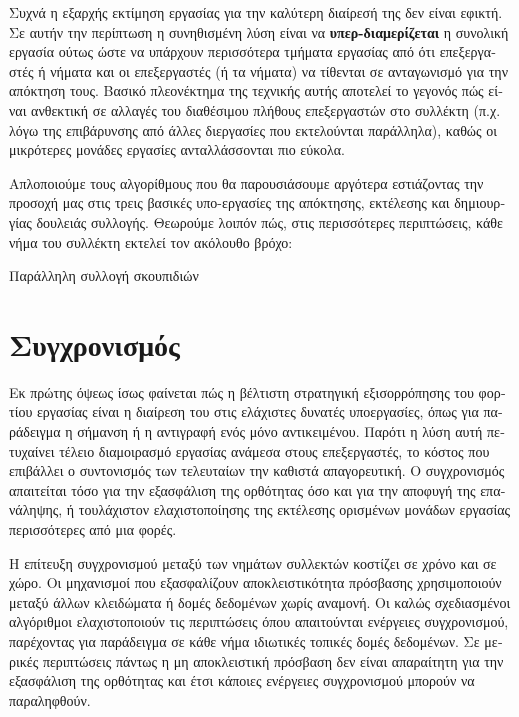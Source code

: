 \begin{greek}
Συχνά η εξαρχής εκτίμηση εργασίας για την καλύτερη διαίρεσή της
δεν είναι εφικτή. Σε αυτήν την περίπτωση η συνηθισμένη λύση
είναι να \textbf{υπερ-διαμερίζεται} η συνολική εργασία ούτως
ώστε να υπάρχουν περισσότερα τμήματα εργασίας από ότι επεξεργαστές
ή νήματα και οι επεξεργαστές (ή τα νήματα) να τίθενται σε
ανταγωνισμό για την απόκτηση τους. Βασικό πλεονέκτημα της τεχνικής
αυτής αποτελεί το γεγονός πώς είναι ανθεκτική σε αλλαγές του
διαθέσιμου πλήθους επεξεργαστών στο συλλέκτη (π.χ. λόγω της
επιβάρυνσης από άλλες διεργασίες που εκτελούνται παράλληλα), καθώς
οι μικρότερες μονάδες εργασίες ανταλλάσσονται πιο εύκολα.

Απλοποιούμε τους αλγορίθμους που θα παρουσιάσουμε αργότερα εστιάζοντας
την προσοχή μας στις τρεις βασικές υπο-εργασίες της απόκτησης,
εκτέλεσης και δημιουργίας δουλειάς συλλογής. Θεωρούμε λοιπόν πώς,
στις περισσότερες περιπτώσεις, κάθε νήμα του συλλέκτη εκτελεί
τον ακόλουθο βρόχο:

\begin{algorithm}
  \caption{Παράλληλη συλλογή σκουπιδιών}
  \label{alg:par_1}
  \begin{algorithmic}[1]
        \State {}
        \State {}
        \State {}
      \EndWhile
    \EndProcedure
  \end{algorithmic}
\end{algorithm}

\section{Συγχρονισμός}
Εκ πρώτης όψεως ίσως φαίνεται πώς η βέλτιστη στρατηγική
εξισορρόπησης του φορτίου εργασίας είναι η διαίρεση του στις
ελάχιστες δυνατές υποεργασίες, όπως για παράδειγμα η σήμανση
ή η αντιγραφή ενός μόνο αντικειμένου. Παρότι η λύση αυτή πετυχαίνει
τέλειο διαμοιρασμό εργασίας ανάμεσα στους επεξεργαστές, το
κόστος που επιβάλλει ο συντονισμός των τελευταίων την καθιστά
απαγορευτική. Ο συγχρονισμός απαιτείται τόσο για την εξασφάλιση
της ορθότητας όσο και για την αποφυγή της επανάληψης, ή
τουλάχιστον ελαχιστοποίησης της εκτέλεσης ορισμένων μονάδων
εργασίας περισσότερες από μια φορές.

Η επίτευξη συγχρονισμού μεταξύ των νημάτων συλλεκτών κοστίζει
σε χρόνο και σε χώρο. Οι μηχανισμοί που εξασφαλίζουν αποκλειστικότητα
πρόσβασης χρησιμοποιούν μεταξύ άλλων κλειδώματα ή δομές
δεδομένων χωρίς αναμονή. Οι καλώς σχεδιασμένοι αλγόριθμοι
ελαχιστοποιούν τις περιπτώσεις όπου απαιτούνται ενέργειες
συγχρονισμού, παρέχοντας για παράδειγμα σε κάθε νήμα ιδιωτικές
τοπικές δομές δεδομένων. Σε μερικές περιπτώσεις πάντως η
μη αποκλειστική πρόσβαση δεν είναι απαραίτητη για την εξασφάλιση
της ορθότητας και έτσι κάποιες ενέργειες συγχρονισμού μπορούν
να παραληφθούν.


\end{greek}
